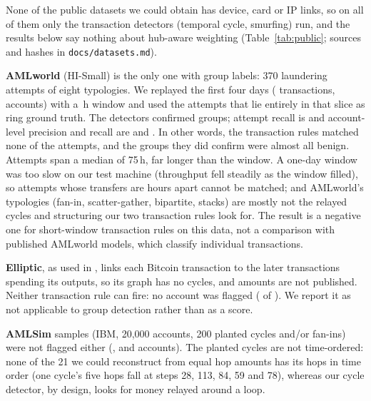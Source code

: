 None of the public datasets we could obtain has device, card or IP links, so on
all of them only the transaction detectors (temporal cycle, smurfing) run, and
the results below say nothing about hub-aware weighting
(Table~\ref{tab:public}; sources and hashes in \texttt{docs/datasets.md}).

\textbf{AMLworld} \cite{altman2023amlworld} (HI-Small) is the only one with
group labels: 370 laundering attempts of eight typologies. We replayed the first
four days (\PubAmlRows{} transactions, \PubAmlAccounts{} accounts) with a
\PubAmlWindow{}\,h window and used the \PubAmlGroups{} attempts that lie
entirely in that slice as ring ground truth. The detectors confirmed
\PubAmlGroupsFlagged{} groups; attempt recall is \PubAmlGroupR{} and
account-level precision and recall are \PubAmlAccP{} and \PubAmlAccR{}.
In other words, the transaction rules matched none of the attempts, and the
groups they did confirm were almost all benign. Attempts span a median of
75\,h, far longer than the window. A one-day window was too slow on our test
machine (throughput fell steadily as the window filled), so attempts whose
transfers are hours apart cannot be matched; and AMLworld's typologies (fan-in,
scatter-gather, bipartite, stacks) are mostly not the relayed cycles and
structuring our two transaction rules look for. The result is a negative one
for short-window transaction rules on this data, not a comparison with
published AMLworld models, which classify individual transactions.

\textbf{Elliptic}, as used in \cite{badjie2026ensembles,kumar2026tagat}, links each Bitcoin transaction to
the later transactions spending its outputs, so its graph has no cycles, and
amounts are not published. Neither transaction rule can fire: no account was
flagged (\PubEllFlagged{} of \PubEllAccounts{}). We report it as not applicable
to group detection rather than as a score.

\textbf{AMLSim} samples (IBM, 20{,}000 accounts, 200 planted cycles and/or
fan-ins) were not flagged either (\PubSimCycleFlagged{}, \PubSimFaninFlagged{}
and \PubSimBothFlagged{} accounts). The planted cycles are not time-ordered:
none of the 21 we could reconstruct from equal hop amounts has its hops in time
order (one cycle's five hops fall at steps 28, 113, 84, 59 and 78), whereas our
cycle detector, by design, looks for money relayed around a loop.


